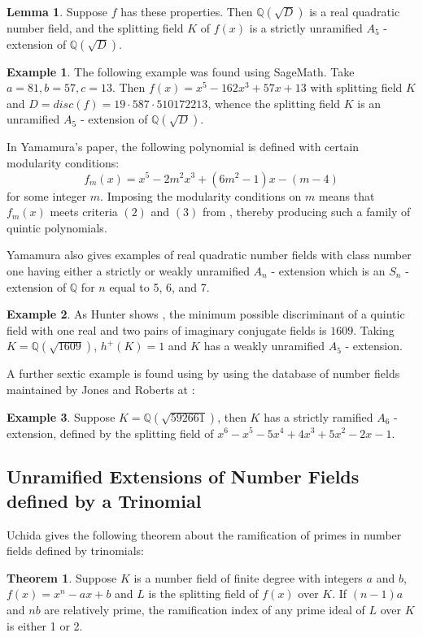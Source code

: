 \documentclass[12pt]{extarticle}
\newcommand{\Q}{\mathbb{Q}}
\newcommand{\<}{\langle}
\renewcommand{\>}{\rangle}
\theoremstyle{definition}
\newtheorem{theorem}{Theorem}
\newtheorem{example}{Example}
\newtheorem{lemma}{Lemma}
\begin{document}
\begin{lemma}
Suppose $f$ has these properties. Then $\Q(\sqrt{D})$ is a real quadratic number field, and the splitting field $K$ of $f(x) $ is a strictly unramified $A_5$ - extension of $\Q(\sqrt{D})$. 
\end{lemma}
\begin{example}
    The following example was found using SageMath. Take $a=81,b=57,c=13$. Then $f(x) = x^5-162x^3+57x+13$ with splitting field $K$ and $D= disc(f) = 19 \cdot 587 \cdot 510172213$, whence the splitting field $K$ is an unramified $A_5$ - extension of $\Q(\sqrt{D})$. 
\end{example}
In Yamamura's paper, the following polynomial is defined with certain modularity conditions: 
\begin{equation}
f_m(x)= x^5-2m^2x^3+(6m^2-1)x-(m-4)
\end{equation}
  for some integer $m$. Imposing the modularity conditions on $m$ means that $f_m(x)$ meets criteria $(2)$ and $(3)$ from , thereby producing such a family of quintic polynomials. \par
Yamamura also gives examples of real quadratic number fields with class number one having either a strictly or weakly unramified $A_n$ - extension which is an $S_n$ - extension of $\Q$ for $n$ equal to 5, 6, and 7. 
\begin{example}
As Hunter shows \cite{HUNTER}, the minimum possible discriminant of a quintic field with one real and two pairs of imaginary conjugate fields is $1609$. 
Taking $K=\Q(\sqrt{1609})$, $h^{+}(K)=1$ and $K$ has a weakly unramified $A_5$ - extension.
\end{example}
A further sextic example is found using by using the database of number fields maintained by Jones and Roberts at \cite{JONE2}:
\begin{example}
Suppose $K=\Q(\sqrt{592661})$, then $K$ has a strictly ramified $A_6$ - extension, defined by the splitting field of $x^6 - x^5 - 5x^4 + 4x^3 + 5x^2 - 2x - 1$. 
\end{example}


\subsection{Unramified Extensions of Number Fields defined by a Trinomial}

Uchida \cite{uchida1970} gives the following theorem about the ramification of primes in number fields defined by trinomials:
\begin{theorem}
Suppose $K$ is a number field of finite degree with integers $a$ and $b$, \\ 
$f(x) = x^n-ax+b$ and $L$ is the splitting field of $f(x)$ over $K$. If $(n-1)a$ and $nb$ are relatively prime, the ramification index of any prime ideal of $L$ over $K$ is either 1 or 2.  \label{thm:uchida_index}
\end{theorem}
\end{document}

